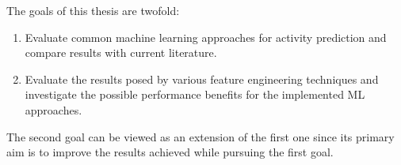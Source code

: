 The goals of this thesis are twofold: 
\begin{enumerate}
    \item Evaluate common machine learning approaches for activity prediction 
    and compare results with current literature.
    \item Evaluate the results posed by various feature engineering techniques and 
    investigate the possible performance benefits for the implemented ML approaches. 
\end{enumerate}

The second goal can be viewed as an extension of the first one since its primary aim is to
improve the results achieved while pursuing the first goal.